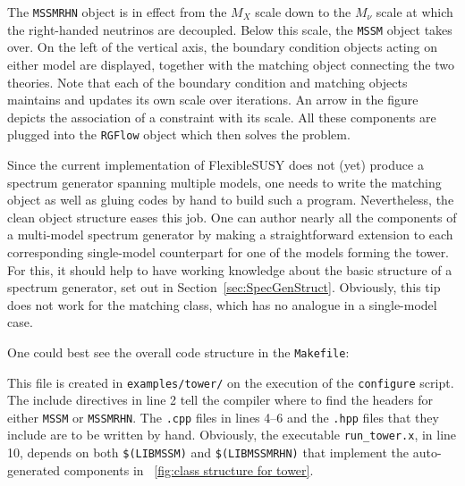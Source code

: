 \documentclass[final,3p,11pt,pdflatex]{elsarticle}
\makeatletter
\newcommand{\fs}{FlexibleSUSY\@\xspace}
\newcommand{\code}[1]{\lstinline|#1|}  %
\newcommand{\figref}[1]{\figurename~\ref{#1}}
\newcommand{\secref}[1]{Section~\ref{#1}}
\makeatother
\begin{document}
The \code{MSSMRHN} object is in effect from the $M_X$ scale down to
the $M_\nu$ scale at which the right-handed neutrinos are decoupled.
Below this scale, the \code{MSSM} object takes over.
On the left of the vertical axis,
the boundary condition objects acting on either model are displayed,
together with the matching object connecting the two theories.
Note that each of the boundary condition and matching objects
maintains and updates its own scale over iterations.
An arrow in the figure depicts
the association of a constraint with its scale.
All these components are plugged into the \code{RGFlow} object
which then solves the problem.

Since the current implementation of \fs does not (yet)
produce a spectrum generator spanning multiple models,
one needs to write the matching object
as well as gluing codes by hand to build such a program.
Nevertheless, the clean object structure eases this job.
One can author nearly all the components of a multi-model spectrum generator
by making a straightforward extension
to each corresponding single-model counterpart
for one of the models forming the tower.
For this, it should help to have working knowledge about the basic structure
of a spectrum generator, set out in \secref{sec:SpecGenStruct}.
Obviously, this tip does not work for the matching class,
which has no analogue in a single-model case.

One could best see the overall code structure in the \code{Makefile}:
This file is created in \code{examples/tower/}
on the execution of the \code{configure} script.
The include directives in line 2 tell the compiler
where to find the headers for either \code{MSSM} or \code{MSSMRHN}.
The \code{.cpp} files in lines 4--6 and the \code{.hpp} files
that they include are to be written by hand.
Obviously, the executable \code{run_tower.x}, in line 10, depends on both
\code{$(LIBMSSM)} and \code{$(LIBMSSMRHN)}
that implement the auto-generated
components in \figref{fig:class structure for tower}.
\end{document}
